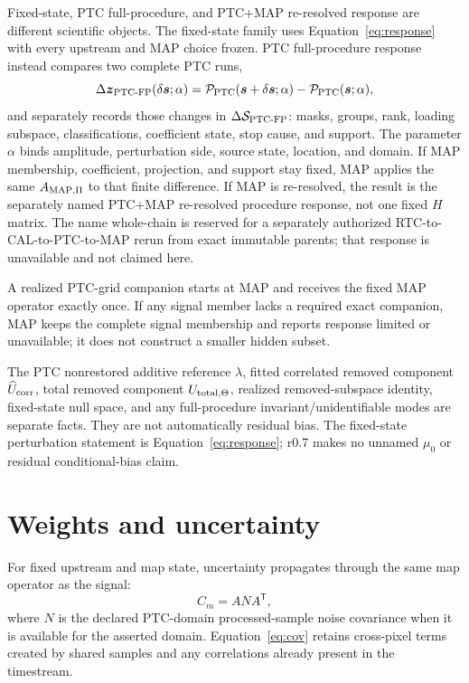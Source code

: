 \documentclass[10pt]{article}
\begin{document}
Fixed-state, PTC full-procedure, and PTC+MAP re-resolved response are different
scientific objects. The fixed-state family uses Equation~\eqref{eq:response}
with every upstream and MAP choice frozen. PTC full-procedure response instead
compares two complete PTC runs,
\[
 \Delta\boldsymbol z_{{\rm PTC}\text{-}{\rm FP}}(\delta\boldsymbol s;\alpha)
 =\mathcal P_{\rm PTC}(\boldsymbol s+\delta\boldsymbol s;\alpha)
  -\mathcal P_{\rm PTC}(\boldsymbol s;\alpha),
\]
and separately records those changes in
\(\Delta\mathcal S_{{\rm PTC}\text{-}{\rm FP}}\): masks, groups, rank, loading subspace,
classifications, coefficient state, stop cause, and support. The parameter
\(\alpha\) binds amplitude, perturbation side, source state, location, and
domain. If MAP membership, coefficient, projection, and support stay fixed,
MAP applies the same \(A_{{\rm MAP},\Pi}\) to that finite difference. If MAP
is re-resolved, the result is the separately named PTC+MAP re-resolved
procedure response, not one fixed \(H\) matrix. The name whole-chain is
reserved for a separately authorized RTC-to-CAL-to-PTC-to-MAP rerun from
exact immutable parents; that response is unavailable and not claimed here.

A realized PTC-grid companion starts at MAP and receives the fixed MAP
operator exactly once. If any signal member lacks a required exact companion,
MAP keeps the complete signal membership and reports response limited or
unavailable; it does not construct a smaller hidden subset.

The PTC nonrestored additive reference \(\lambda\), fitted correlated removed
component \(\widehat U_{\rm corr}\), total removed component
\(U_{{\rm total},\Theta}\), realized removed-subspace identity, fixed-state
null space, and any full-procedure invariant/unidentifiable modes are separate
facts. They are not automatically residual bias. The fixed-state perturbation
statement is Equation~\eqref{eq:response}; r0.7 makes no unnamed \(\mu_0\) or
residual conditional-bias claim.

\clearpage
\section{Weights and uncertainty}\label{sec:uncertainty}
For fixed upstream and map state, uncertainty propagates through the same map
operator as the signal:
\begin{equation}
 C_m=A N A^{\mathsf T},
 \label{eq:cov}
\end{equation}
where \(N\) is the declared PTC-domain processed-sample noise covariance when
it is available for the asserted domain. Equation~\eqref{eq:cov}
retains cross-pixel terms created by shared samples and any correlations
already present in the timestream.
\end{document}
